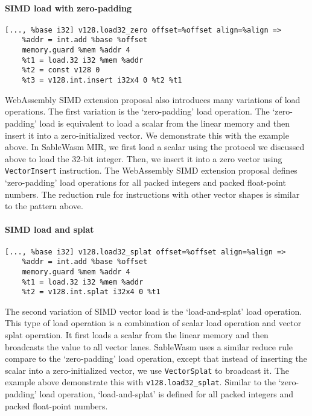 \paragraph{SIMD load with zero-padding} \quad
\begin{lstlisting}[basicstyle=\linespread{1}\small\ttfamily, language=SableWasmMIR]
[..., %base i32] v128.load32_zero offset=%offset align=%align =>
    %addr = int.add %base %offset
    memory.guard %mem %addr 4
    %t1 = load.32 i32 %mem %addr
    %t2 = const v128 0
    %t3 = v128.int.insert i32x4 0 %t2 %t1
\end{lstlisting}
WebAssembly SIMD extension proposal also introduces many variations of load operations. The first variation is the `zero-padding' load operation. The `zero-padding' load is equivalent to load a scalar from the linear memory and then insert it into a zero-initialized vector. We demonstrate this with the example above. In SableWasm MIR, we first load a scalar using the protocol we discussed above to load the 32-bit integer. Then, we insert it into a zero vector using \texttt{VectorInsert} instruction. The WebAssembly SIMD extension proposal defines `zero-padding' load operations for all packed integers and packed float-point numbers. The reduction rule for instructions with other vector shapes is similar to the pattern above.

\paragraph{SIMD load and splat} \quad
\begin{lstlisting}[basicstyle=\linespread{1}\small\ttfamily, language=SableWasmMIR]
[..., %base i32] v128.load32_splat offset=%offset align=%align =>
    %addr = int.add %base %offset
    memory.guard %mem %addr 4
    %t1 = load.32 i32 %mem %addr
    %t2 = v128.int.splat i32x4 0 %t1
\end{lstlisting}
The second variation of SIMD vector load is the `load-and-splat' load operation. This type of load operation is a combination of scalar load operation and vector splat operation. It first loads a scalar from the linear memory and then broadcasts the value to all vector lanes. SableWasm uses a similar reduce rule compare to the `zero-padding' load operation, except that instead of inserting the scalar into a zero-initialized vector, we use \texttt{VectorSplat} to broadcast it. The example above demonstrate this with \texttt{v128.load32\_splat}. Similar to the `zero-padding' load operation, `load-and-splat' is defined for all packed integers and packed float-point numbers.


